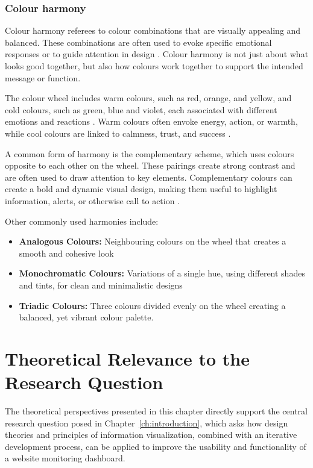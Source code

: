\subsubsection{Colour harmony}
\label{subsubsec:colour_harmony}


Colour harmony referees to colour combinations that are visually appealing and balanced. These combinations are often used to evoke specific emotional responses or to guide attention in design \autocite{ParkUni}. Colour harmony is not just about what looks good together, but also how colours work together to support the intended message or function. 

The colour wheel includes warm colours, such as red, orange, and yellow, and cold colours, such as green, blue and violet, each associated with different emotions and reactions \autocite{Canva}. Warm colours often envoke energy, action, or warmth, while cool colours are linked to calmness, trust, and success \autocite{ParkUni}.

A common form of harmony is the complementary scheme, which uses colours opposite to each other on the wheel. These pairings create strong contrast and are often used to draw attention to key elements. Complementary colours can create a bold and dynamic visual design, making them useful to highlight information, alerts, or otherwise call to action \autocite{Canva}.

Other commonly used harmonies include:
\begin{itemize}
    \item \textbf{Analogous Colours:} Neighbouring colours on the wheel that creates a smooth and cohesive look
    \item \textbf{Monochromatic Colours:} Variations of a single hue, using different shades and tints, for clean and minimalistic designs
    \item \textbf{Triadic Colours:} Three colours divided evenly on the wheel creating a balanced, yet vibrant colour palette. 
\end{itemize}


\section{Theoretical Relevance to the Research Question}
\label{sec:what_why}

The theoretical perspectives presented in this chapter directly support the central research question posed in Chapter~\ref{ch:introduction}, which asks how design theories and principles of information visualization, combined with an iterative development process, can be applied to improve the usability and functionality of a website monitoring dashboard.

